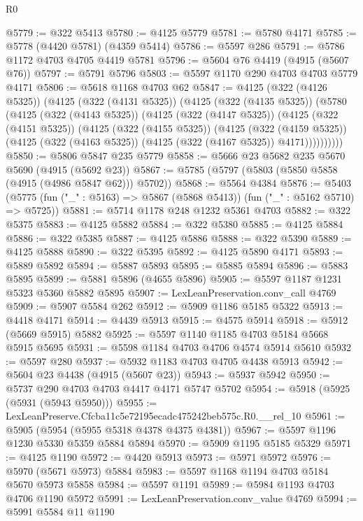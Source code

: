 \begin{lexlean}{R0}
\begin{coremodule}
@5779 := @322 @5413
@5780 := @4125 @5779
@5781 := @5780 @4171
@5785 := @5778 (@4420 @5781) (@4359 @5414)
@5786 := @5597 @286
@5791 := @5786 @1172 @4703 @4705 @4419 @5781
@5796 := @5604 @76 @4419 (@4915 (@5607 @76))
@5797 := @5791 @5796
@5803 := @5597 @1170 @290 @4703 @4703 @5779 @4171
@5806 := @5618 @1168 @4703 @62
@5847 := @4125
    (@322 (@4126 @5325))
    (@4125
      (@322 (@4131 @5325))
      (@4125
        (@322 (@4135 @5325))
        (@5780
          (@4125
            (@322 (@4143 @5325))
            (@4125
              (@322 (@4147 @5325))
              (@4125
                (@322 (@4151 @5325))
                (@4125
                  (@322 (@4155 @5325))
                  (@4125
                    (@322 (@4159 @5325))
                    (@4125 (@322 (@4163 @5325)) (@4125 (@322 (@4167 @5325)) @4171))))))))))
@5850 := @5806 @5847 @235 @5779
@5858 := @5666 @23 @5682 @235 @5670 @5690 (@4915 (@5692 @23))
@5867 := @5785 (@5797 (@5803 (@5850 @5858 (@4915 (@4986 @5847 @62))) @5702))
@5868 := @5564 @4384
@5876 := @5403 (@5775 (fun ("_" : @5163) => @5867 (@5868 @5413)) (fun ("_" : @5162 @5710) => @5725))
@5881 := @5714 @1178 @248 @1232 @5361 @4703
@5882 := @322 @5375
@5883 := @4125 @5882
@5884 := @322 @5380
@5885 := @4125 @5884
@5886 := @322 @5385
@5887 := @4125 @5886
@5888 := @322 @5390
@5889 := @4125 @5888
@5890 := @322 @5395
@5892 := @4125 @5890 @4171
@5893 := @5889 @5892
@5894 := @5887 @5893
@5895 := @5885 @5894
@5896 := @5883 @5895
@5899 := @5881 @5896 (@4655 @5896)
@5905 := @5597 @1187 @1231 @5323 @5360 @5882 @5895
@5907 := LexLeanPreservation.conv_call @4769
@5909 := @5907 @5584 @262
@5912 := @5909 @1186 @5185 @5322
@5913 := @4418 @4171
@5914 := @4439 @5913
@5915 := @4575 @5914
@5918 := @5912 (@5669 @5915) @5882
@5925 := @5597 @1140 @1185 @4703 @5184 @5668 @5915 @5695
@5931 := @5598 @1184 @4703 @4706 @4574 @5914 @5610
@5932 := @5597 @280
@5937 := @5932 @1183 @4703 @4705 @4438 @5913
@5942 := @5604 @23 @4438 (@4915 (@5607 @23))
@5943 := @5937 @5942
@5950 := @5737 @290 @4703 @4703 @4417 @4171 @5747 @5702
@5954 := @5918 (@5925 (@5931 (@5943 @5950)))
@5955 := LexLeanPreserve.Cfcba11c5e72195ecadc475242beb575c.R0.__rel_10
@5961 := @5905 (@5954 (@5955 @5318 @4378 @4375 @4381))
@5967 := @5597 @1196 @1230 @5330 @5359 @5884 @5894
@5970 := @5909 @1195 @5185 @5329
@5971 := @4125 @1190
@5972 := @4420 @5913
@5973 := @5971 @5972
@5976 := @5970 (@5671 @5973) @5884
@5983 := @5597 @1168 @1194 @4703 @5184 @5670 @5973 @5858
@5984 := @5597 @1191
@5989 := @5984 @1193 @4703 @4706 @1190 @5972
@5991 := LexLeanPreservation.conv_value @4769
@5994 := @5991 @5584 @11 @1190

\end{coremodule}
\end{lexlean}
